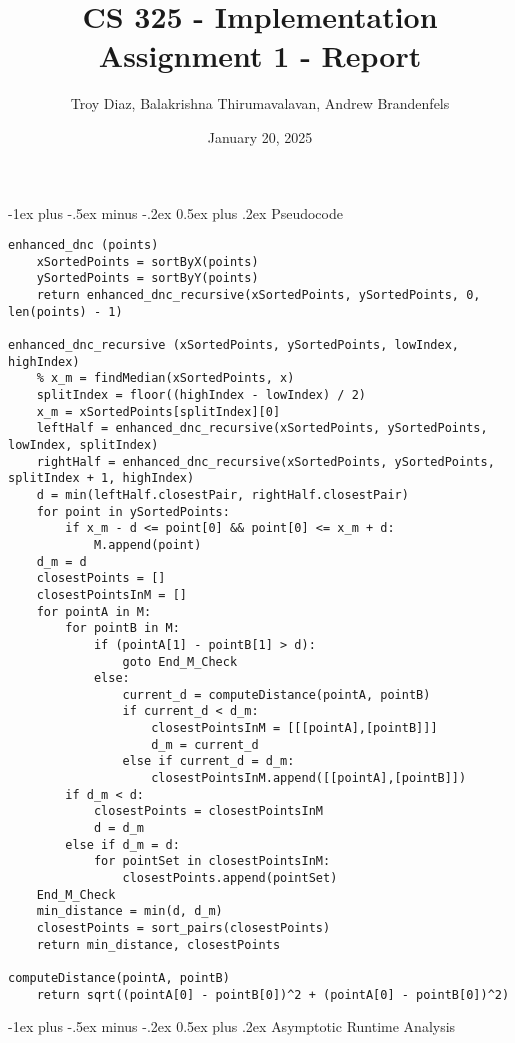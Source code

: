 \documentclass{article}
\title{CS 325 - Implementation Assignment 1 - Report}
\author{Troy Diaz, Balakrishna Thirumavalavan, Andrew Brandenfels}
\date{January 20, 2025}
\makeatletter
\renewcommand{\section}{\@startsection{section}{1}{0mm}%
                                {-1ex plus -.5ex minus -.2ex}%
                                {0.5ex plus .2ex}%
                                {\normalfont\large\bfseries}}
\makeatother
\begin{document}
\maketitle
\section{Pseudocode}
\begin{verbatim}
enhanced_dnc (points)
    xSortedPoints = sortByX(points)
    ySortedPoints = sortByY(points)
    return enhanced_dnc_recursive(xSortedPoints, ySortedPoints, 0, len(points) - 1)

enhanced_dnc_recursive (xSortedPoints, ySortedPoints, lowIndex, highIndex)
    % x_m = findMedian(xSortedPoints, x)
    splitIndex = floor((highIndex - lowIndex) / 2)
    x_m = xSortedPoints[splitIndex][0]
    leftHalf = enhanced_dnc_recursive(xSortedPoints, ySortedPoints, lowIndex, splitIndex)
    rightHalf = enhanced_dnc_recursive(xSortedPoints, ySortedPoints, splitIndex + 1, highIndex)
    d = min(leftHalf.closestPair, rightHalf.closestPair)
    for point in ySortedPoints:
        if x_m - d <= point[0] && point[0] <= x_m + d:
            M.append(point)
    d_m = d
    closestPoints = []
    closestPointsInM = []
    for pointA in M:
        for pointB in M:
            if (pointA[1] - pointB[1] > d):
                goto End_M_Check
            else:
                current_d = computeDistance(pointA, pointB)
                if current_d < d_m:
                    closestPointsInM = [[[pointA],[pointB]]]
                    d_m = current_d
                else if current_d = d_m:
                    closestPointsInM.append([[pointA],[pointB]])
        if d_m < d:
            closestPoints = closestPointsInM
            d = d_m
        else if d_m = d:
            for pointSet in closestPointsInM:
                closestPoints.append(pointSet)
    End_M_Check
    min_distance = min(d, d_m)
    closestPoints = sort_pairs(closestPoints)
    return min_distance, closestPoints

computeDistance(pointA, pointB)
    return sqrt((pointA[0] - pointB[0])^2 + (pointA[0] - pointB[0])^2)

\end{verbatim}
\section{Asymptotic Runtime Analysis}
\end{document}
